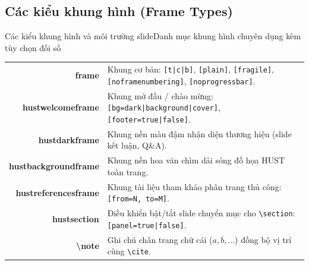 \documentclass[aspectratio=43,10pt]{beamer}
\begin{document}
\subsection{Các kiểu khung hình (Frame Types)}
\begin{frame}{Các kiểu khung hình và môi trường slide}{Danh mục khung hình chuyên dụng kèm tùy chọn đối số}
  \scriptsize
  \centering
  \begin{tabularx}{\textwidth}{>{\ttfamily\bfseries\color{hustmain}}r >{\small}X}
    frame               & Khung cơ bản: \texttt{[t|c|b]}, \texttt{[plain]}, \texttt{[fragile]}, \texttt{[noframenumbering]}, \texttt{[noprogressbar]}. \\
    hustwelcomeframe    & Khung mở đầu / chào mừng: \texttt{[bg=dark|background|cover]}, \texttt{[footer=true|false]}. \\
    hustdarkframe       & Khung nền màu đậm nhận diện thương hiệu (slide kết luận, Q\&A). \\
    hustbackgroundframe & Khung nền hoa văn chìm dải sóng đồ họa HUST toàn trang. \\
    hustreferencesframe & Khung tài liệu tham khảo phân trang thủ công: \texttt{[from=N, to=M]}. \\
    hustsection         & Điều khiển bật/tắt slide chuyển mục cho \texttt{\textbackslash section}: \texttt{[panel=true|false]}. \\
    \textbackslash note & Ghi chú chân trang chữ cái ($a, b, \dots$) đồng bộ vị trí cùng \texttt{\textbackslash cite}. \\
  \end{tabularx}
\end{frame}
\end{document}
